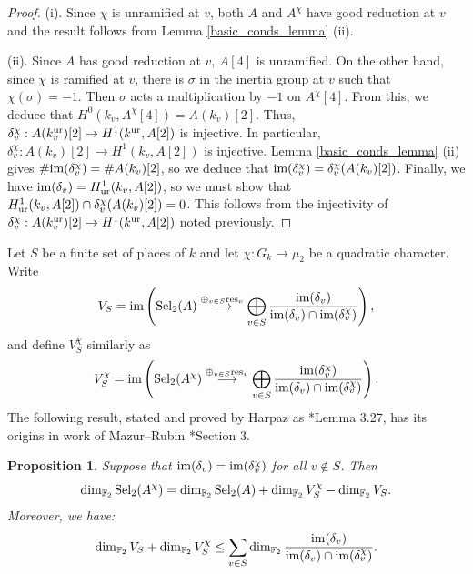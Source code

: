 \documentclass[10pt]{amsart}
\numberwithin{equation}{section}
\newtheorem{proposition}[equation]{Proposition}
\theoremstyle{remark}
\theoremstyle{definition}
\theoremstyle{definition}
\theoremstyle{definition}
\theoremstyle{definition}
\theoremstyle{definition}
\theoremstyle{definition}
\theoremstyle{definition}
\theoremstyle{definition}
\begin{document}
\begin{proof}
(i). Since $\chi$ is unramified at $v$, both $A$ and $A^\chi$ have good reduction at $v$ and the result follows from Lemma \ref{basic_conds_lemma} (ii). 

(ii). Since $A$ has good reduction at $v$, $A[4]$ is unramified. On the other hand, since $\chi$ is ramified at $v$, there is $\sigma$ in the inertia group at $v$ such that $\chi(\sigma)=-1$. Then $\sigma$ acts a multiplication by $-1$ on $A^\chi[4]$. From this, we deduce that $H^0(k_v,A^\chi[4])=A(k_v)[2]$. Thus, $\delta_v^\chi:A(k^{\textup{ur}}_v)[2]\to H^1(k^{\textup{ur}},A[2])$ is injective. In particular, $\delta_v^\chi:A(k_v)[2] \to H^1(k_v,A[2])$ is injective. Lemma \ref{basic_conds_lemma} (ii) gives $\#\textup{im}(\delta_v^\chi)=\#A(k_v)[2]$, so we deduce that $\textup{im}(\delta_v^\chi)=\delta_v^\chi(A(k_v)[2])$. Finally, we have $\textup{im}(\delta_v)=H^1_{\textup{ur}}(k_v,A[2])$, so we must show that $H^1_{\textup{ur}}(k_v,A[2])\cap \delta_v^\chi(A(k_v)[2])=0$. This follows from the injectivity of $\delta_v^\chi:A(k^{\textup{ur}}_v)[2]\to H^1(k^{\textup{ur}},A[2])$ noted previously. 
\end{proof}

Let $S$ be a finite set of places of $k$ and let $\chi:G_k\to \mu_2$ be a quadratic character. Write 
\[
V_{S}  = \textup{im}\left(\textup{Sel}_2(A) \stackrel{\oplus_{v\in S}\textup{res}_v}{\longrightarrow} \bigoplus_{v\in S} \frac{\textup{im}(\delta_v)}{\textup{im}(\delta_v)\cap \textup{im}(\delta_v^\chi)}\right),
\]
and define $V_{S}^{\chi}$ similarly as 
\[
V_{S}^\chi  = \textup{im}\left(\textup{Sel}_2(A^\chi) \stackrel{\oplus_{v\in S}\textup{res}_v}{\longrightarrow} \bigoplus_{v\in S} \frac{\textup{im}(\delta_v^\chi)}{\textup{im}(\delta_v)\cap \textup{im}(\delta_v^\chi)}\right).
\]  
The following result, stated and proved by Harpaz as  \cite{Har19}*{Lemma 3.27}, has its origins in work of Mazur--Rubin \cite{MazRub2010}*{Section 3}.

\begin{proposition} \label{prop:mazur_rubin_harpaz}
Suppose that $\textup{im}(\delta_v)=\textup{im}(\delta_v^\chi)$ for all $v\notin S$. Then 
\begin{equation} \label{eq:selmer_change_dims}
\dim_{\mathbb{F}_2} \textup{Sel}_2(A^{\chi}) = \dim_{\mathbb{F}_2} \textup{Sel}_2(A) + \dim_{\mathbb{F}_2} V_S^{\chi} - \dim_{\mathbb{F}_2} V_S.
\end{equation}
Moreover, we have:
\[
\dim_{\mathbb{F}_2} V_S  + \dim_{\mathbb{F}_2} V_S^{\chi} \leq \sum_{v \in S} \dim_{\mathbb{F}_2} \frac{\textup{im}(\delta_v)}{\textup{im}(\delta_v) \cap \textup{im}(\delta_v^\chi)}.
\]
 \end{proposition}
\end{document}
